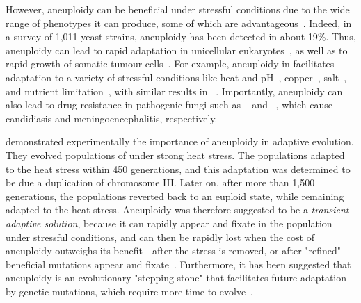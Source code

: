 \documentclass[12pt]{extarticle}
\begin{document}
However, aneuploidy can be beneficial under stressful conditions due to the wide range of phenotypes it can produce, some of which are advantageous~\citep{Pavelka2010, Yang2021}.
Indeed, in a survey of 1,011 yeast strains, aneuploidy has been detected in about 19\%\citep{Peter2018}.
Thus, aneuploidy can lead to rapid adaptation in unicellular eukaryotes~\citep{Gerstein2015,Torres2010, Hong2014, Rancati2008}, as well as to rapid growth of somatic tumour cells~\citep{Schvartzman2010, Sheltzer2017}.
For example, aneuploidy in \yeast facilitates adaptation to a variety of stressful conditions like heat and pH~\citep{Yona2012}, copper~\citep{Covo2014, Gerstein2015}, salt~\citep{Dhar2011}, and nutrient limitation~\citep{Dunham2002, Gresham2008, Avecilla2022}, with similar results in \calbicans~\citep{Yang2021}.
Importantly, aneuploidy can also lead to drug resistance in pathogenic fungi such as \calbicans~\citep{Selmecki2008, Selmecki2010, Gerstein2018} and \cneoformans~\citep{Sionov2010}, which cause candidiasis and meningoencephalitis, respectively.

\citet{Yona2012} demonstrated experimentally the importance of aneuploidy in adaptive evolution. They evolved populations of \yeast under strong heat stress.
The populations adapted to the heat stress within 450 generations, and this adaptation was determined to be due a duplication of chromosome III.
Later on, after more than 1,500 generations, the populations reverted back to an euploid state, while remaining adapted to the heat stress. 
Aneuploidy was therefore suggested to be a \emph{transient adaptive solution}, because it can rapidly appear and fixate in the population under stressful conditions, and can then be rapidly lost when the cost of aneuploidy outweighs its benefit---after the stress is removed, or after "refined" beneficial mutations appear and fixate~\citep{Yona2012}.
Furthermore, it has been suggested that aneuploidy is an evolutionary "stepping stone" that facilitates future adaptation by genetic mutations, which require more time to evolve~\citep{Yona2012,Yona2015}.
\end{document}
